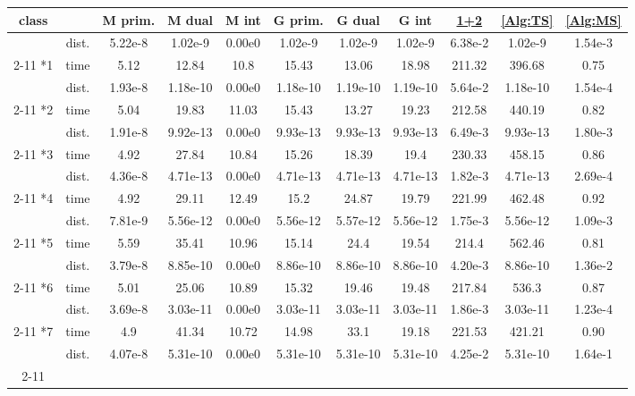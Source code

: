 \documentclass[english]{pkupaper}
\begin{document}
\begin{table}[htbp]
\centering \footnotesize
\begin{tabular}{|c|c|c|c|c|c|c|c|c|c|c|}
\hline
class & & M prim. & M dual & M int & G prim. & G dual & G int & \hyperlink{EAlg:12}{1+2} & \ref{Alg:TS} & \ref{Alg:MS} \\ \hline
& dist. & 5.22e-8 & 1.02e-9 & 0.00e0 & 1.02e-9 & 1.02e-9 & 1.02e-9 & 6.38e-2 & 1.02e-9 & 1.54e-3 \\ \cline{2-11}
\multirow{-2}*{1} & time & 5.12 & 12.84 & 10.8 & 15.43 & 13.06 & 18.98 & 211.32 & 396.68 & 0.75 \\ \hline
& dist. & 1.93e-8 & 1.18e-10 & 0.00e0 & 1.18e-10 & 1.19e-10 & 1.19e-10 & 5.64e-2 & 1.18e-10 & 1.54e-4 \\ \cline{2-11}
\multirow{-2}*{2} & time & 5.04 & 19.83 & 11.03 & 15.43 & 13.27 & 19.23 & 212.58 & 440.19 & 0.82 \\ \hline
& dist. & 1.91e-8 & 9.92e-13 & 0.00e0 & 9.93e-13 & 9.93e-13 & 9.93e-13 & 6.49e-3 & 9.93e-13 & 1.80e-3 \\ \cline{2-11}
\multirow{-2}*{3} & time & 4.92 & 27.84 & 10.84 & 15.26 & 18.39 & 19.4 & 230.33 & 458.15 & 0.86 \\ \hline
& dist. & 4.36e-8 & 4.71e-13 & 0.00e0 & 4.71e-13 & 4.71e-13 & 4.71e-13 & 1.82e-3 & 4.71e-13 & 2.69e-4 \\ \cline{2-11}
\multirow{-2}*{4} & time & 4.92 & 29.11 & 12.49 & 15.2 & 24.87 & 19.79 & 221.99 & 462.48 & 0.92 \\ \hline
& dist. & 7.81e-9 & 5.56e-12 & 0.00e0 & 5.56e-12 & 5.57e-12 & 5.56e-12 & 1.75e-3 & 5.56e-12 & 1.09e-3 \\ \cline{2-11}
\multirow{-2}*{5} & time & 5.59 & 35.41 & 10.96 & 15.14 & 24.4 & 19.54 & 214.4 & 562.46 & 0.81 \\ \hline
& dist. & 3.79e-8 & 8.85e-10 & 0.00e0 & 8.86e-10 & 8.86e-10 & 8.86e-10 & 4.20e-3 & 8.86e-10 & 1.36e-2 \\ \cline{2-11}
\multirow{-2}*{6} & time & 5.01 & 25.06 & 10.89 & 15.32 & 19.46 & 19.48 & 217.84 & 536.3 & 0.87 \\ \hline
& dist. & 3.69e-8 & 3.03e-11 & 0.00e0 & 3.03e-11 & 3.03e-11 & 3.03e-11 & 1.86e-3 & 3.03e-11 & 1.23e-4 \\ \cline{2-11}
\multirow{-2}*{7} & time & 4.9 & 41.34 & 10.72 & 14.98 & 33.1 & 19.18 & 221.53 & 421.21 & 0.90 \\ \hline
& dist. & 4.07e-8 & 5.31e-10 & 0.00e0 & 5.31e-10 & 5.31e-10 & 5.31e-10 & 4.25e-2 & 5.31e-10 & 1.64e-1 \\ \cline{2-11}

\end{tabular}
\end{table}
\end{document}

